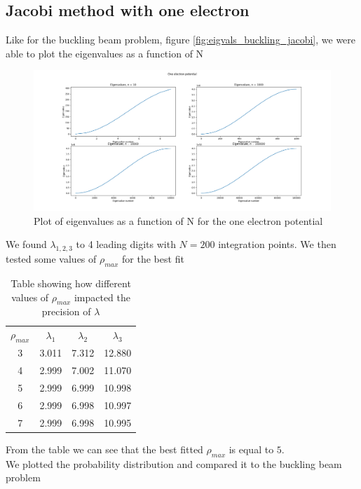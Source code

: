 \documentclass[american,a4paper,12pt]{article}
\begin{document}
\subsection*{Jacobi method with one electron}
Like for the buckling beam problem, figure \ref{fig:eigvals_buckling_jacobi}, we were able to plot the eigenvalues as a function of N
\begin{figure}[H]
    \centering
    \includegraphics[width = \textwidth]{figures/eigvals_1e.png}
    \caption{Plot of eigenvalues as a function of N for the one electron potential}
    \label{fig:eigvals1}
\end{figure}
We found $\lambda_{1,2,3}$ to 4 leading digits with $N = 200$ integration points. We then tested  some values of $\rho_{max}$ for the best fit
\begin{table}[H]
    \centering
    \begin{tabular}{c|c|c|c}
        $\rho_{max}$ & $\lambda_1$ & $\lambda_2$ & $\lambda_3$ \\
        3 & 3.011 & 7.312 & 12.880 \\
        4 & 2.999 & 7.002 & 11.070 \\
        5 & 2.999 & 6.999 & 10.998 \\
        6 & 2.999 & 6.998 & 10.997 \\
        7 & 2.999 & 6.998 & 10.995 \\
    \end{tabular}
    \caption{Table showing how different values of $\rho_{max}$ impacted the precision of $\lambda$}
    \label{tab:rho1}
\end{table}
From the table we can see that the best fitted $\rho_{max}$ is equal to $5$.\\
We plotted the probability distribution and compared it to the buckling beam problem
\end{document}
